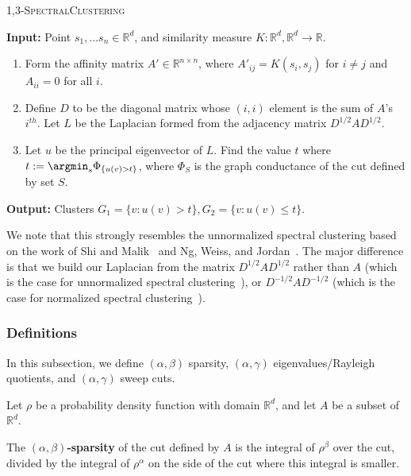 \begin{algorithm}
  \textsc{1,3-SpectralClustering}

  \textbf{Input:} Point $s_1, \ldots s_n \in \mathbb{R}^d$, and similarity measure
  $K:\mathbb{R}^d, \mathbb{R}^d\rightarrow \mathbb{R}$.
  \begin{enumerate}
    \item Form the affinity matrix $A' \in \mathbb{R}^{n \times n}$,
      where $A'_{ij} = K(s_i, s_j)$ for $i \not= j$ and $A_{ii} = 0$ for
      all $i$.
    \item Define $D$ to be the diagonal matrix whose $(i, i)$ element is
      the sum of $A$'s $i^{th}$. Let $L$ be the Laplacian formed
      from the adjacency matrix $D^{1/2}AD^{1/2}$.
    \item Let $u$ be the principal eigenvector of $L$. Find the value
      $t$ where $t := \argmin_s \Phi_{\{u(v) > t\}}$, where $\Phi_S$ is
      the graph conductance of the cut defined by set $S$.
  \end{enumerate}
  \textbf{Output:} Clusters $G_1 = \{v : u(v) > t\}, G_2 = \{v : u(v)
  \leq t\}$.
\end{algorithm}
We note that this strongly resembles the unnormalized spectral
clustering based on the work of Shi and Malik~\cite{ShiMalik97} and Ng,
Weiss, and Jordan~\cite{NgSpectral01}. The major difference is that we build our
Laplacian from the matrix $D^{1/2}AD^{1/2}$ rather than $A$ (which is
the case for unnormalized spectral
clustering~\cite{von2007tutorial, TrillosVariational15}), or
$D^{-1/2}AD^{-1/2}$ (which is the case for normalized spectral
clustering~\cite{von2007tutorial, TrillosVariational15}).
\subsubsection{Definitions}\label{sec:definitions}
In this subsection, we define $(\alpha, \beta)$ sparsity, $(\alpha,
\gamma)$ eigenvalues/Rayleigh quotients, and $(\alpha, \gamma)$ sweep
cuts. 

\vspace{2 mm}
\begin{definition} Let $\rho$ be a probability density function with domain
  $\mathbb{R}^d$, and let $A$ be a
  subset of $\mathbb{R}^d$.

  The \textbf{$(\alpha, \beta)$-sparsity} of the cut defined by $A$ is the
  integral of
  $\rho^\beta$ over the cut, divided by the integral of
  $\rho^\alpha$ on the side of the cut where this integral is
  smaller.

\end{definition}
\vspace{2 mm}

